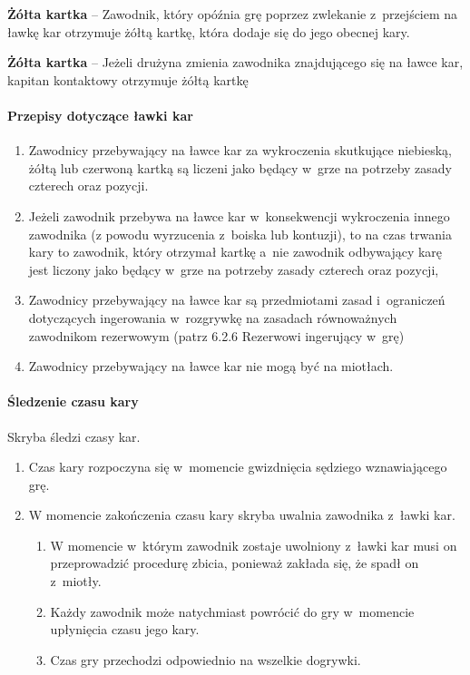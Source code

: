 \documentclass[12pt]{article}
\newcommand\yellowcard[1]{\bgroup\textcolor{darkyellow}{\textbf{#1}}}
\begin{document}
\yellowcard{Żółta kartka} -- Zawodnik, który opóźnia grę poprzez zwlekanie z~przejściem na ławkę kar otrzymuje żółtą kartkę, która dodaje się do jego
obecnej kary.

\yellowcard{Żółta kartka} -- Jeżeli drużyna zmienia zawodnika znajdującego się
na ławce kar, kapitan kontaktowy otrzymuje żółtą kartkę

\paragraph{Przepisy dotyczące ławki kar}

\begin{enumerate}
	\item
	      Zawodnicy przebywający na ławce kar za wykroczenia skutkujące
	      niebieską, żółtą lub czerwoną kartką są liczeni jako będący w~grze na
	      potrzeby zasady czterech oraz pozycji.
	\item
	      Jeżeli zawodnik przebywa na ławce kar w~konsekwencji wykroczenia
	      innego zawodnika (z powodu wyrzucenia z~boiska lub kontuzji), to na
	      czas trwania kary to zawodnik, który otrzymał kartkę a~nie zawodnik
	      odbywający karę jest liczony jako będący w~grze na potrzeby zasady
	      czterech oraz pozycji,
	\item
	      Zawodnicy przebywający na ławce kar są przedmiotami zasad i~ograniczeń
	      dotyczących ingerowania w~rozgrywkę na zasadach równoważnych
	      zawodnikom rezerwowym (patrz 6.2.6 Rezerwowi ingerujący w~grę)
	\item
	      Zawodnicy przebywający na ławce kar nie mogą być na miotłach.
\end{enumerate}

\paragraph{Śledzenie czasu kary}
Skryba śledzi czasy kar.

\begin{enumerate}
	\item
	      Czas kary rozpoczyna się w~momencie gwizdnięcia sędziego wznawiającego
	      grę.
	\item
	      W momencie zakończenia czasu kary skryba uwalnia zawodnika z~ławki
	      kar.

	      \begin{enumerate}
		      \item
		            W momencie w~którym zawodnik zostaje uwolniony z~ławki kar musi on
		            przeprowadzić procedurę zbicia, ponieważ zakłada się, że spadł on z~miotły.
		      \item
		            Każdy zawodnik może natychmiast powrócić do gry w~momencie
		            upłynięcia czasu jego kary.
		      \item
		            Czas gry przechodzi odpowiednio na wszelkie dogrywki.
	      \end{enumerate}
\end{enumerate}
\end{document}
